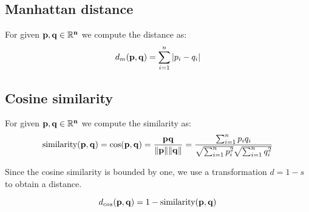 \subsection{Manhattan distance}

For given $\bf{p}, \bf{q} \in \mathbb{R}^n$ we compute the distance as:
\begin{equation}
d_m({\bf p},{\bf q}) = {\sum_{i=1}^n |p_i - q_i|}    
\end{equation}


\subsection{Cosine similarity}

For given $\bf{p}, \bf{q} \in \mathbb{R}^n$ we compute the similarity as:
\begin{equation}
\text{similarity}({\bf p},{\bf q}) = \cos ({\bf p},{\bf q})= {{\bf p} {\bf q} \over \|{\bf p}\| \|{\bf q}\|} = \frac{ \sum_{i=1}^{n}{p_i q_i} }{ \sqrt{\sum_{i=1}^{n}{p_i^2}} \sqrt{\sum_{i=1}^{n}{q_i^2}} }
\end{equation}

Since the cosine similarity is bounded by one, we use a transformation $d = 1 - s$ to obtain a distance.

\begin{equation}
    d_{cos}({\bf p},{\bf q}) = 1 - \text{similarity}({\bf p},{\bf q})
\end{equation}